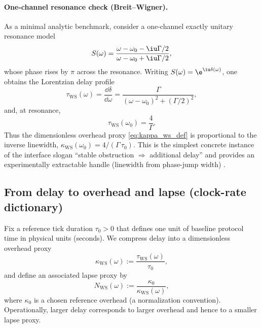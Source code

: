 \paragraph{One-channel resonance check (Breit--Wigner).}
As a minimal analytic benchmark, consider a one-channel exactly unitary resonance model
\begin{equation}
\label{eq:breit_wigner_S_omega}
S(\omega)=\frac{\omega-\omega_0-\iu\Gamma/2}{\omega-\omega_0+\iu\Gamma/2},
\end{equation}
whose phase rises by $\pi$ across the resonance.
Writing $S(\omega)=\e^{\iu\delta(\omega)}$, one obtains the Lorentzian delay profile
\begin{equation}
\label{eq:breit_wigner_tau_omega}
\tau_{\mathrm{WS}}(\omega)=\frac{\dd\delta}{\dd\omega}
=\frac{\Gamma}{(\omega-\omega_0)^2+(\Gamma/2)^2},
\end{equation}
and, at resonance,
\begin{equation}
\label{eq:tau_ws_peak}
\tau_{\mathrm{WS}}(\omega_0)=\frac{4}{\Gamma}.
\end{equation}
Thus the dimensionless overhead proxy \eqref{eq:kappa_ws_def} is proportional to the inverse linewidth, $\kappa_{\mathrm{WS}}(\omega_0)=4/(\Gamma\,\tau_0)$.
This is the simplest concrete instance of the interface slogan ``stable obstruction $\Rightarrow$ additional delay'' and provides an experimentally extractable handle (linewidth from phase-jump width) \cite{Wigner1955,Smith1960}.

\subsection{From delay to overhead and lapse (clock-rate dictionary)}
\label{app:delay_to_lapse_dictionary}

Fix a reference tick duration $\tau_0>0$ that defines one unit of baseline protocol time in physical units (seconds).
We compress delay into a dimensionless overhead proxy
\begin{equation}
\label{eq:kappa_ws_def}
\kappa_{\mathrm{WS}}(\omega):=\frac{\tau_{\mathrm{WS}}(\omega)}{\tau_0},
\end{equation}
and define an associated lapse proxy by
\begin{equation}
\label{eq:lapse_ws_def}
N_{\mathrm{WS}}(\omega):=\frac{\kappa_0}{\kappa_{\mathrm{WS}}(\omega)},
\end{equation}
where $\kappa_0$ is a chosen reference overhead (a normalization convention).
Operationally, larger delay corresponds to larger overhead and hence to a smaller lapse proxy.

